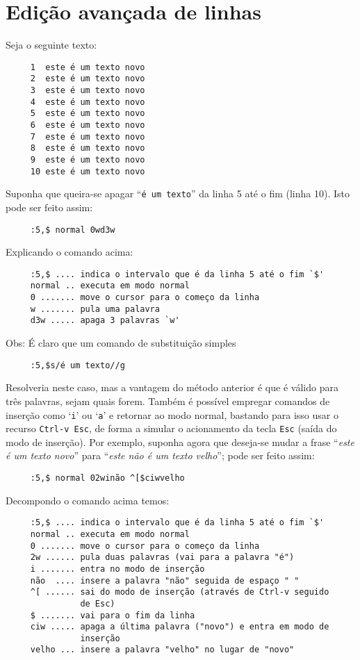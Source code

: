 \section{Edição avançada de linhas}

Seja o seguinte texto:

\begin{verbatim}
     1  este é um texto novo
     2  este é um texto novo
     3  este é um texto novo
     4  este é um texto novo
     5  este é um texto novo
     6  este é um texto novo
     7  este é um texto novo
     8  este é um texto novo
     9  este é um texto novo
     10 este é um texto novo
\end{verbatim}

Suponha que queira-se apagar ``{\tt é um texto}'' da linha 5 até o fim (linha
10). Isto pode ser feito assim:

\begin{verbatim}
     :5,$ normal 0wd3w
\end{verbatim}

Explicando o comando acima:

\begin{verbatim}
     :5,$ .... indica o intervalo que é da linha 5 até o fim `$'
     normal .. executa em modo normal
     0 ....... move o cursor para o começo da linha
     w ....... pula uma palavra
     d3w ..... apaga 3 palavras `w'
\end{verbatim}

Obs: É claro que um comando de substituição simples

\begin{verbatim}
     :5,$s/é um texto//g
\end{verbatim}

Resolveria neste caso, mas a vantagem do método anterior é que
é válido para três palavras, sejam quais forem.  
Também é possível empregar comandos de inserção como `{\tt i}' ou `{\tt a}' e
retornar ao modo normal, bastando para isso usar o recurso \verb|Ctrl-v Esc|,
de forma a simular o acionamento da tecla \verb|Esc| (saída do modo de
inserção). Por exemplo, suponha agora que deseja-se mudar a frase ``{\em este
é um texto novo}'' para ``{\em este não é um texto velho}''; pode ser feito
assim:

\begin{verbatim}
     :5,$ normal 02winão ^[$ciwvelho
\end{verbatim}

Decompondo o comando acima temos:

\begin{verbatim}
     :5,$ .... indica o intervalo que é da linha 5 até o fim `$'
     normal .. executa em modo normal
     0 ....... move o cursor para o começo da linha
     2w ...... pula duas palavras (vai para a palavra "é")
     i ....... entra no modo de inserção
     não  .... insere a palavra "não" seguida de espaço " "
     ^[ ...... sai do modo de inserção (através de Ctrl-v seguido 
               de Esc)
     $ ....... vai para o fim da linha
     ciw ..... apaga a última palavra ("novo") e entra em modo de 
               inserção
     velho ... insere a palavra "velho" no lugar de "novo"
\end{verbatim}

